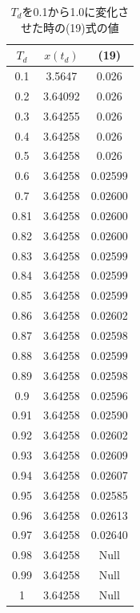 \documentclass[twocolumn, 10pt,a4j]{jsarticle}
\begin{document}
    \begin{table}
      \begin{center}
        \caption{$T_{d}$を0.1から1.0に変化させた時の(19)式の値}
        \begin{tabular}{|c|c|c|} \hline
          \footnotesize
            $T_{d}$ & $x(t_{d})$ & (19) \\ \hline
            0.1	& 3.5647 & 0.026 \\
            0.2	& 3.64092	& 0.026 \\
            0.3	& 3.64255	& 0.026 \\
            0.4	& 3.64258	& 0.026 \\
            0.5	& 3.64258	& 0.026 \\
            0.6	& 3.64258	& 0.02599 \\
            0.7	& 3.64258	& 0.02600 \\
            0.81 & 3.64258	& 0.02600 \\
            0.82 & 3.64258	& 0.02600 \\
            0.83 & 3.64258	& 0.02599 \\
            0.84 & 3.64258	& 0.02599 \\
            0.85 & 3.64258	& 0.02599 \\
            0.86 & 3.64258	& 0.02602 \\
            0.87 & 3.64258	& 0.02598 \\
            0.88 & 3.64258	& 0.02599 \\
            0.89 & 3.64258	& 0.02598 \\
            0.9 & 3.64258	& 0.02596 \\
            0.91 & 3.64258	& 0.02590 \\
            0.92 & 3.64258	& 0.02602 \\
            0.93 & 3.64258	& 0.02609 \\
            0.94 & 3.64258	& 0.02607 \\
            0.95 & 3.64258	& 0.02585 \\
            0.96 & 3.64258	& 0.02613 \\
            0.97 & 3.64258	& 0.02640 \\
            0.98 & 3.64258	& Null \\
            0.99 & 3.64258	& Null \\
            1 & 3.64258	& Null \\ \hline
        \end{tabular}
      \end{center}
    \end{table}
\end{document}
